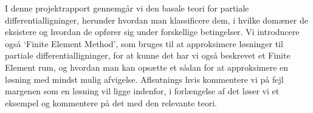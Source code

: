 I denne projektrapport gennemgår vi den basale teori for partiale differentialligninger, 
herunder hvordan man klassificere dem, i hvilke domæner de eksistere og hvordan de opfører sig under forskellige betingelser.
Vi introducere også `Finite Element Method', som bruges til at approksimere løsninger til partiale differentialligninger, 
for at kunne det har vi også beskrevet et Finite Element rum, og hvordan man kan opsætte et sådan for at approksimere en løsning med mindst mulig afvigelse. 
Aflsutnings hvis kommentere vi på fejl margenen som en løsning vil ligge indenfor, i forlængelse af det løser vi et eksempel og kommentere på det med den relevante teori.